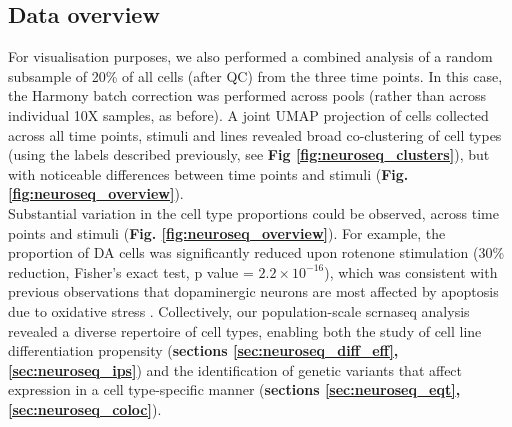 




\newpage

\subsection{Data overview}

For visualisation purposes, we also performed a combined analysis of a random subsample of 20\% of all cells (after QC) from the three time points.
In this case, the Harmony batch correction was performed across pools (rather than across individual 10X samples, as before).
A joint UMAP projection of cells collected across all time points, stimuli and lines revealed broad co-clustering of cell types (using the labels described previously, see \textbf{Fig \ref{fig:neuroseq_clusters}}), but with noticeable differences between time points and stimuli (\textbf{Fig. \ref{fig:neuroseq_overview}}). \\

Substantial variation in the cell type proportions could be observed, across time points and stimuli (\textbf{Fig. \ref{fig:neuroseq_overview}}). 
For example, the proportion of DA cells was significantly reduced upon rotenone stimulation (30\% reduction, Fisher’s exact test, p value = $2.2 \times 10^{-16}$), which was consistent with previous observations that dopaminergic neurons are most affected by apoptosis due to oxidative stress \cite{sherer2003mechanism, knonagel1992autologous, cannon2009highly}.
Collectively, our population-scale \gls{scrnaseq} analysis revealed a diverse repertoire of cell types, enabling both the study of cell line differentiation propensity (\textbf{sections \ref{sec:neuroseq_diff_eff}, \ref{sec:neuroseq_ips}}) and the identification of genetic variants that affect expression in a cell type-specific manner (\textbf{sections \ref{sec:neuroseq_eqt}, \ref{sec:neuroseq_coloc}}). 
\\ 

